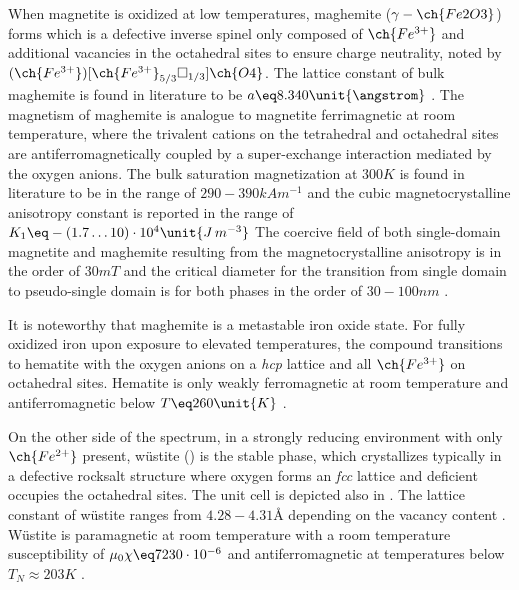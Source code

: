 \documentclass[\main/dresen_thesis.tex]{subfiles}
\begin{document}
  When magnetite is oxidized at low temperatures, maghemite ($\gamma-\ch{Fe2O3}$) forms which is a defective inverse spinel only composed of $\ch{Fe^{3+}}$ and additional vacancies in the octahedral sites to ensure charge neutrality, noted by $(\ch{Fe^{3+}})[\ch{Fe^{3+}}_{5/3}\square_{1/3}]\ch{O4}$.
  The lattice constant of bulk maghemite is found in literature to be $a \eq 8.340 \unit{\angstrom}$ \cite{Cornell_2003_Their}.
  The magnetism of maghemite is analogue to magnetite ferrimagnetic at room temperature, where the trivalent cations on the tetrahedral and octahedral sites are antiferromagnetically coupled by a super-exchange interaction mediated by the oxygen anions.
  The bulk saturation magnetization at $300 \unit{K}$ is found in literature to be in the range of $290 - 390 \unit{kA m^{-1}}$ and the cubic magnetocrystalline anisotropy constant is reported in the range of $K_1 \eq -(1.7 \ldots 10) \cdot 10^{4} \unit{J \, m^{-3}}$ \cite{Cornell_2003_Their}
  The coercive field of both single-domain magnetite and maghemite resulting from the magnetocrystalline anisotropy is in the order of $30 \unit{mT}$ and the critical diameter for the transition from single domain to pseudo-single domain is for both phases in the order of $30 - 100 \unit{nm}$ \cite{Cornell_2003_Their}.

  It is noteworthy that maghemite is a metastable iron oxide state.
  For fully oxidized iron upon exposure to elevated temperatures, the compound transitions to hematite with the oxygen anions on a \textit{hcp} lattice and all $\ch{Fe^{3+}}$ on octahedral sites.
  Hematite is only weakly ferromagnetic at room temperature and antiferromagnetic below $T \eq 260 \unit{K}$ \cite{Cornell_2003_Their}.

  On the other side of the spectrum, in a strongly reducing environment with only $\ch{Fe^{2+}}$ present, w\"ustite () is the stable phase, which crystallizes typically in a defective rocksalt structure where oxygen forms an \textit{fcc} lattice and deficient  occupies the octahedral sites.
  The unit cell is depicted also in .
  The lattice constant of w\"ustite ranges from $4.28 - 4.31 \unit{\angstrom}$ depending on the vacancy content \cite{Cornell_2003_Their}.
  W\"ustite is paramagnetic at room temperature with a room temperature susceptibility of $\mu_0 \chi \eq 7230 \cdot 10^{-6}$ \cite{Lide_2004_Handb} and antiferromagnetic at temperatures below $T_N \approx 203 K$ \cite{Cornell_2003_Their}.
\end{document}
